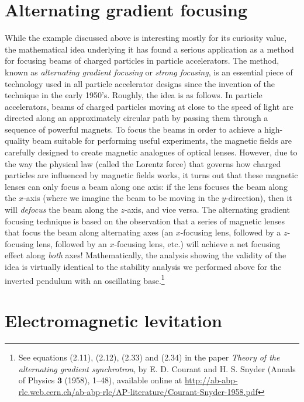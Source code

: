 \documentclass[11pt]{report}
\theoremstyle{plain}
\theoremstyle{definition}
\begin{document}
\section{Alternating gradient focusing}

While the example discussed above is interesting
mostly for its curiosity value, the mathematical idea
underlying it has found a serious application as a
method for focusing beams of charged particles in
particle accelerators. The method, known as
\emph{alternating gradient focusing} or \emph{strong focusing},
is an essential piece of technology used in all
particle accelerator designs since the invention of
the technique in the early 1950's. Roughly, the idea
is as follows. In particle accelerators, beams of
charged particles moving at close to the speed of
light are directed along an approximately circular
path by passing them through a sequence of powerful
magnets. To focus the beams in order to achieve a
high-quality beam suitable for performing useful
experiments, the magnetic fields are carefully
designed to create magnetic analogues of optical
lenses. However, due to the way the physical law
(called the Lorentz force) that governs how charged
particles are influenced by magnetic fields works, it
turns out that these magnetic lenses can only focus a
beam along one axis: if the lens focuses the beam
along the $x$-axis (where we imagine the beam to be
moving in the $y$-direction), then it will \emph{defocus}
the beam along the $z$-axis, and vice versa. The
alternating gradient focusing technique is based on
the observation that a series of magnetic lenses that
focus the beam along alternating axes (an $x$-focusing
lens, followed by a $z$-focusing lens, followed by an
$x$-focusing lens, etc.) will achieve a net focusing
effect along \emph{both} axes! Mathematically, the analysis
showing the validity of the idea is virtually
identical to the stability analysis we performed above
for the inverted pendulum with an oscillating
base.\footnote{See equations (2.11), (2.12), (2.33) and (2.34) in the
paper \emph{Theory of the alternating gradient
synchrotron}, by E. D. Courant and H. S. Snyder
(Annals of Physics $\textbf{3}$ (1958), 1--48),
available online at
\href{http://ab-abp-rlc.web.cern.ch/ab-abp-rlc/AP-literature/Courant-Snyder-1958.pdf}{http://ab-abp-rlc.web.cern.ch/ab-abp-rlc/AP-literature/Courant-Snyder-1958.pdf}}

\section{Electromagnetic levitation}
\end{document}
